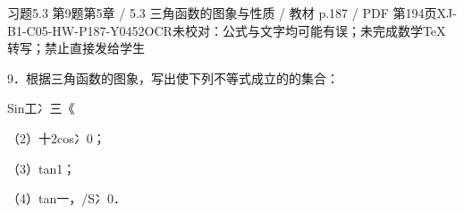 \begin{bankitem}{习题5.3 第9题}{第5章 / 5.3 三角函数的图象与性质 / 教材 p.187 / PDF 第194页}{XJ-B1-C05-HW-P187-Y0452}{OCR未校对：公式与文字均可能有误；未完成数学TeX转写；禁止直接发给学生}
\begin{ocrdraft}
\par
9．根据三角函数的图象，写出使下列不等式成立的的集合：
\par
Sin工冫三《
\par
（2）十2cos冫0；
\par
（3）tan1；
\par
（4）tan一，/S冫0．
\end{ocrdraft}
\end{bankitem}
